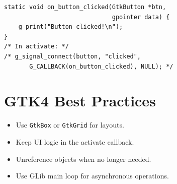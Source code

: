\documentclass[11pt,a4paper]{article}
\begin{document}
\begin{lstlisting}
static void on_button_clicked(GtkButton *btn,
                              gpointer data) {
    g_print("Button clicked!\n");
}
/* In activate: */
/* g_signal_connect(button, "clicked",
       G_CALLBACK(on_button_clicked), NULL); */
\end{lstlisting}

\section{GTK4 Best Practices}
\begin{itemize}
  \item Use \texttt{GtkBox} or \texttt{GtkGrid} for layouts.
  \item Keep UI logic in the activate callback.
  \item Unreference objects when no longer needed.
  \item Use GLib main loop for asynchronous operations.
\end{itemize}
\end{document}
